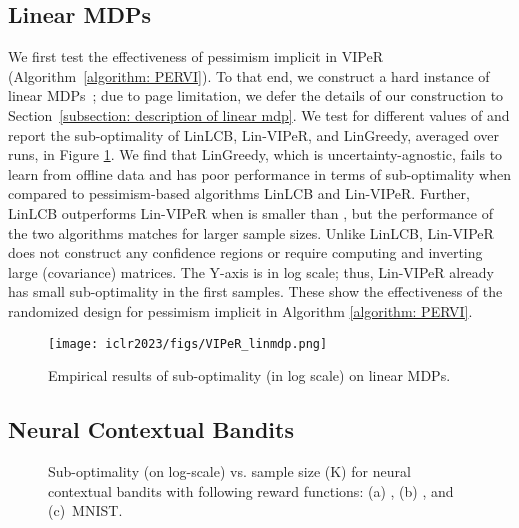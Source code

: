 \documentclass{article} \usepackage{iclr2023/iclr2023_conference,times}
\begin{document}
\subsection{Linear MDPs}
\label{subsection: linear mdp}


We first test the effectiveness of pessimism implicit in VIPeR (Algorithm~\ref{algorithm: PERVI}). To that end, we construct a hard instance of linear MDPs~\citep{yinnear,min2021variance}; due to page limitation, we defer the details of our construction to Section~\ref{subsection: description of linear mdp}. We test for different values of  and report the sub-optimality of LinLCB, Lin-VIPeR, and LinGreedy, averaged over  runs, in Figure \ref{fig: linear mdp}. 
We find that LinGreedy, which is uncertainty-agnostic, fails to learn from offline data and has poor performance in terms of sub-optimality when compared to pessimism-based algorithms LinLCB and Lin-VIPeR. Further, LinLCB outperforms Lin-VIPeR when  is smaller than , but the performance of the two algorithms matches for larger sample sizes. Unlike LinLCB, Lin-VIPeR does not construct any confidence regions or require computing and inverting large (covariance) matrices. The Y-axis is in log scale; thus, Lin-VIPeR already has small sub-optimality in the first  samples. These show the effectiveness of the randomized design for pessimism implicit in Algorithm \ref{algorithm: PERVI}. 















\begin{figure}
\centering
    \texttt{[image: iclr2023/figs/VIPeR\_linmdp.png]}
    \caption{Empirical results of sub-optimality (in log scale) on linear MDPs.}
    \label{fig: linear mdp}
    \vspace{-10pt}
\end{figure}




\subsection{Neural Contextual Bandits}
\label{subsection: main neural contextual bandits}
\begin{figure}[h!]
    \centering
    \vspace{-10pt}
    \vspace{-15pt}
    \caption{Sub-optimality (on log-scale) vs. sample size (K) for neural contextual bandits with following reward functions: (a) , (b) , and (c)~MNIST. }
\label{fig: neural contextuable bandits}
\end{figure}
\end{document}
